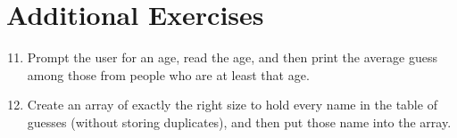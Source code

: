 \documentclass[11pt]{article}
\begin{document}
\section*{Additional Exercises}

\begin{enumerate}
\setcounter{enumii}{10}
\item  
Prompt the user for an age,
read the age,
and then print the average guess
among those from people who are at least that age.
\item
Create an array of exactly the right size to hold every name in the table of guesses
(without storing duplicates),
and then put those name into the array.
\end{enumerate}
%
%
%
%  
%
\end{document}
